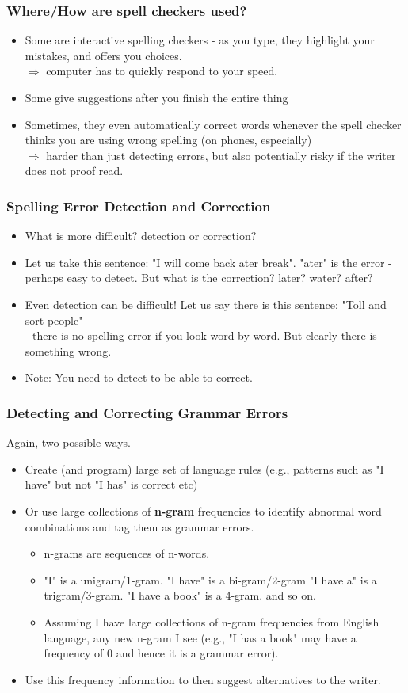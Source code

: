 \documentclass{beamer}
\begin{document}
\begin{frame}
\frametitle{Where/How are spell checkers used?}
\begin{itemize}
\item Some are interactive spelling checkers - as you type, they highlight your mistakes, and offers you choices.
\\ $\Rightarrow$ computer has to quickly respond to your speed.
\item Some give suggestions after you finish the entire thing
\item Sometimes, they even automatically correct words whenever the spell checker thinks you are using wrong spelling (on phones, especially)
\\ $\Rightarrow$ harder than just detecting errors, but also potentially risky if the writer does not proof read.
\end{itemize}
\end{frame}

\begin{frame}
\frametitle{Spelling Error Detection and Correction}
\begin{itemize}
\item What is more difficult? detection or correction? \pause
\item Let us take this sentence: "I will come back ater break". "ater" is the error - perhaps easy to detect. But what is the correction? later? water? after? \pause
\item Even detection can be difficult! Let us say there is this sentence: "Toll and sort people" \\
 - there is no spelling error if you look word by word. But clearly there is something wrong.  \pause
\item Note: You need to detect to be able to correct. 
\end{itemize}
\end{frame}

\begin{frame}
\frametitle{Detecting and Correcting Grammar Errors}
Again, two possible ways.
\begin{itemize}
\item Create (and program) large set of language rules (e.g., patterns such as "I have" but not "I has" is correct etc) \pause
\item Or use large collections of \textbf{n-gram} frequencies to identify abnormal word combinations and tag them as grammar errors. 
\begin{itemize}
\item n-grams are sequences of n-words.
\item "I" is a unigram/1-gram. "I have" is a bi-gram/2-gram "I have a" is a trigram/3-gram. "I have a book" is a 4-gram. and so on.
\item Assuming I have large collections of n-gram frequencies from English language, any new n-gram I see (e.g., "I has a book" may have a frequency of 0 and hence it is a grammar error).
\end{itemize} \pause
\item Use this frequency information to then suggest alternatives to the writer.
\end{itemize}
\end{frame}
\end{document}
